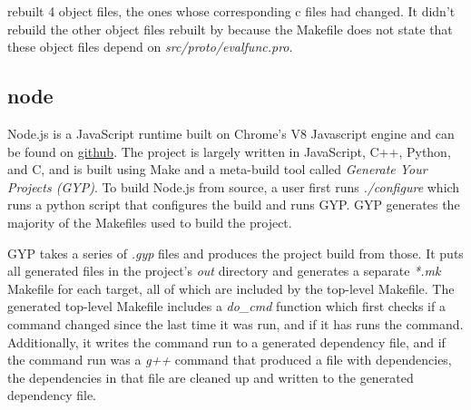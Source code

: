 \begin{description}
\begin{description}
  \end{description}
\end{description}

\Make rebuilt 4 object files, the ones whose corresponding c files had changed.  It didn't rebuild the other object files rebuilt by \Rattle because the Makefile does not state that these object files
depend on \emph{src/proto/evalfunc.pro}.


\subsection{node}

Node.js is a JavaScript runtime built on Chrome's V8 Javascript engine and can be found on \href{``https://github.com/nodejs/node''}{github}.  The project is largely written in JavaScript, C++, Python, and C, and is built using Make and a meta-build tool called \emph{Generate Your Projects (GYP)}.  To build Node.js from source, a user first runs \emph{./configure} which runs a python script that configures the build and runs GYP.  GYP generates the majority of the Makefiles used to build the project.

GYP takes a series of \emph{.gyp} files and produces the project build from those.  It puts all generated files in the project's \emph{out} directory and generates a separate \emph{*.mk} Makefile for each target, all of which are included by the top-level Makefile.  The generated top-level Makefile includes a \emph{do\_cmd} function which first checks if a command changed since the last time it was run, and if it has runs the command.  Additionally, it writes the command run to a generated dependency file, and if the command run was a \emph{g++} command that produced a file with dependencies, the dependencies in that file are cleaned up and written to the generated dependency file.


